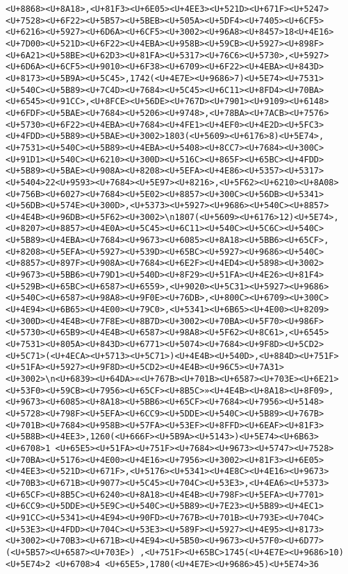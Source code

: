 \documentclass[
]{article}
\begin{document}
\begin{verbatim}
<U+8868><U+8A18>,<U+81F3><U+6E05><U+4EE3><U+521D><U+671F><U+5247><U+7528><U+6F22><U+5B57><U+5BEB><U+505A><U+5DF4><U+7405><U+6CF5><U+6216><U+5927><U+6D6A><U+6CF5><U+3002><U+96A8><U+8457>18<U+4E16><U+7D00><U+521D><U+6F22><U+4EBA><U+958B><U+59CB><U+5927><U+898F><U+6A21><U+58BE><U+62D3><U+81FA><U+5317><U+76C6><U+5730>,<U+5927><U+6D6A><U+6CF5><U+9010><U+6F38><U+6709><U+6F22><U+4EBA><U+843D><U+8173><U+5B9A><U+5C45>,1742(<U+4E7E><U+9686>7)<U+5E74><U+7531><U+540C><U+5B89><U+7C4D><U+7684><U+5C45><U+6C11><U+8FD4><U+70BA><U+6545><U+91CC>,<U+8FCE><U+56DE><U+767D><U+7901><U+9109><U+6148><U+6FDF><U+5BAE><U+7684><U+5206><U+9748>,<U+78BA><U+7ACB><U+7576><U+5730><U+6F22><U+4EBA><U+7684><U+4FE1><U+4EF0><U+4E2D><U+5FC3><U+4FDD><U+5B89><U+5BAE><U+3002>1803(<U+5609><U+6176>8)<U+5E74>,<U+7531><U+540C><U+5B89><U+4EBA><U+5408><U+8CC7><U+7684><U+300C><U+91D1><U+540C><U+6210><U+300D><U+516C><U+865F><U+65BC><U+4FDD><U+5B89><U+5BAE><U+908A><U+8208><U+5EFA><U+4E86><U+5357><U+5317><U+5404>22<U+9593><U+7684><U+5E97><U+8216>,<U+5F62><U+6210><U+8A08><U+756B><U+6027><U+7684><U+5E02><U+8857><U+300C><U+56DB><U+5341><U+56DB><U+574E><U+300D>,<U+5373><U+5927><U+9686><U+540C><U+8857><U+4E4B><U+96DB><U+5F62><U+3002>\n1807(<U+5609><U+6176>12)<U+5E74>,<U+8207><U+8857><U+4E0A><U+5C45><U+6C11><U+540C><U+5C6C><U+540C><U+5B89><U+4EBA><U+7684><U+9673><U+6085><U+8A18><U+5BB6><U+65CF>,<U+8208><U+5EFA><U+5927><U+539D><U+65BC><U+5927><U+9686><U+540C><U+8857><U+897F><U+908A><U+7684><U+6E2F><U+4ED4><U+5898><U+3002><U+9673><U+5BB6><U+79D1><U+540D><U+8F29><U+51FA><U+4E26><U+81F4><U+529B><U+65BC><U+6587><U+6559>,<U+9020><U+5C31><U+5927><U+9686><U+540C><U+6587><U+98A8><U+9F0E><U+76DB>,<U+800C><U+6709><U+300C><U+4E94><U+6B65><U+4E00><U+79C0>,<U+5341><U+6B65><U+4E00><U+8209><U+300D><U+4E4B><U+7F8E><U+8B7D><U+3002><U+70BA><U+5F70><U+986F><U+5730><U+65B9><U+4E4B><U+6587><U+98A8><U+5F62><U+8C61>,<U+6545><U+7531><U+805A><U+843D><U+6771><U+5074><U+7684><U+9F8D><U+5CD2><U+5C71>(<U+4ECA><U+5713><U+5C71>)<U+4E4B><U+540D>,<U+884D><U+751F><U+51FA><U+5927><U+9F8D><U+5CD2><U+4E4B><U+96C5><U+7A31><U+3002>\n<U+6839><U+64DA>«<U+767B><U+701B><U+6587><U+703E><U+6E21><U+53F0><U+59CB><U+7956><U+65CF><U+8B5C>»<U+4E4B><U+8A18><U+8F09>,<U+9673><U+6085><U+8A18><U+5BB6><U+65CF><U+7684><U+7956><U+5148><U+5728><U+798F><U+5EFA><U+6CC9><U+5DDE><U+540C><U+5B89><U+767B><U+701B><U+7684><U+958B><U+57FA><U+53EF><U+8FFD><U+6EAF><U+81F3><U+5B8B><U+4EE3>,1260(<U+666F><U+5B9A><U+5143>)<U+5E74><U+6B63><U+6708>1 <U+65E5><U+51FA><U+751F><U+7684><U+9673><U+5747><U+7528><U+70BA><U+5176><U+4E00><U+4E16><U+7956><U+3002><U+81F3><U+6E05><U+4EE3><U+521D><U+671F>,<U+5176><U+5341><U+4E8C><U+4E16><U+9673><U+70B3><U+671B><U+9077><U+5C45><U+704C><U+53E3>,<U+4EA6><U+5373><U+65CF><U+8B5C><U+6240><U+8A18><U+4E4B><U+798F><U+5EFA><U+7701><U+6CC9><U+5DDE><U+5E9C><U+540C><U+5B89><U+7E23><U+5B89><U+4EC1><U+91CC><U+5341><U+4E94><U+90FD><U+767B><U+701B><U+793E><U+704C><U+53E3><U+4FDD><U+704C><U+53E3><U+589F><U+5927><U+4E95><U+8173><U+3002><U+70B3><U+671B><U+4E94><U+5B50><U+9673><U+57F0><U+6D77>(<U+5B57><U+6587><U+703E>) ,<U+751F><U+65BC>1745(<U+4E7E><U+9686>10)<U+5E74>2 <U+6708>4 <U+65E5>,1780(<U+4E7E><U+9686>45)<U+5E74>36 
\end{verbatim}
\end{document}
